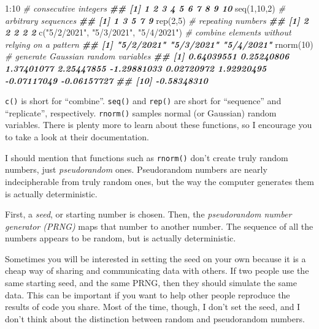 \documentclass[
  12pt,
  krantz2]{krantz}
\makeatletter
\newenvironment{Shaded}{\begin{snugshade}}{\end{snugshade}}
\newcommand{\CommentTok}[1]{\textcolor[rgb]{0.37,0.37,0.37}{\textit{#1}}}
\newcommand{\DecValTok}[1]{\textcolor[rgb]{0.06,0.06,0.06}{#1}}
\newcommand{\DocumentationTok}[1]{\textcolor[rgb]{0.37,0.37,0.37}{\textbf{\textit{#1}}}}
\newcommand{\FunctionTok}[1]{\textcolor[rgb]{0,0,0}{#1}}
\newcommand{\NormalTok}[1]{#1}
\newcommand{\SpecialCharTok}[1]{\textcolor[rgb]{0,0,0}{#1}}
\newcommand{\StringTok}[1]{\textcolor[rgb]{0.5,0.5,0.5}{#1}}
\newenvironment{kframe}{%
\medskip{}
\setlength{\fboxsep}{.8em}
 \def\at@end@of@kframe{}%
 \ifinner\ifhmode%
  \def\at@end@of@kframe{\end{minipage}}%
  \begin{minipage}{\columnwidth}%
 \fi\fi%
 \def\FrameCommand##1{\hskip\@totalleftmargin \hskip-\fboxsep
 \colorbox{shadecolor}{##1}\hskip-\fboxsep
     \hskip-\linewidth \hskip-\@totalleftmargin \hskip\columnwidth}%
 \MakeFramed {\advance\hsize-\width
   \@totalleftmargin\z@ \linewidth\hsize
   \@setminipage}}%
 {\par\unskip\endMakeFramed%
 \at@end@of@kframe}
\renewenvironment{Shaded}{\begin{kframe}}{\end{kframe}}
\makeatother
\begin{document}
\begin{Shaded}
\begin{Highlighting}[]
\DecValTok{1}\SpecialCharTok{:}\DecValTok{10}         \CommentTok{\# consecutive integers}
\DocumentationTok{\#\#  [1]  1  2  3  4  5  6  7  8  9 10}
\FunctionTok{seq}\NormalTok{(}\DecValTok{1}\NormalTok{,}\DecValTok{10}\NormalTok{,}\DecValTok{2}\NormalTok{)  }\CommentTok{\# arbitrary sequences}
\DocumentationTok{\#\# [1] 1 3 5 7 9}
\FunctionTok{rep}\NormalTok{(}\DecValTok{2}\NormalTok{,}\DecValTok{5}\NormalTok{)     }\CommentTok{\# repeating numbers}
\DocumentationTok{\#\# [1] 2 2 2 2 2}
\FunctionTok{c}\NormalTok{(}\StringTok{"5/2/2021"}\NormalTok{, }\StringTok{"5/3/2021"}\NormalTok{, }\StringTok{"5/4/2021"}\NormalTok{) }\CommentTok{\# combine elements without relying on a pattern}
\DocumentationTok{\#\# [1] "5/2/2021" "5/3/2021" "5/4/2021"}
\FunctionTok{rnorm}\NormalTok{(}\DecValTok{10}\NormalTok{)                             }\CommentTok{\# generate Gaussian random variables}
\DocumentationTok{\#\#  [1]  0.64039551  0.25240806  1.37401077  2.25447855 {-}1.29881033  0.02720972  1.92920495 {-}0.07117049 {-}0.06157727}
\DocumentationTok{\#\# [10] {-}0.58348310}
\end{Highlighting}
\end{Shaded}

\texttt{c()} is short for ``combine''. \texttt{seq()} and \texttt{rep()} are short for ``sequence'' and ``replicate'', respectively. \texttt{rnorm()} samples normal (or Gaussian) random variables. There is plenty more to learn about these functions, so I encourage you to take a look at their documentation.

I should mention that functions such as \texttt{rnorm()} don't create truly random numbers, just \emph{pseudorandom} ones. Pseudorandom numbers are nearly indecipherable from truly random ones, but the way the computer generates them is actually deterministic.

First, a \emph{seed}, or starting number is chosen. Then, the \emph{pseudorandom number generator (PRNG)} maps that number to another number. The sequence of all the numbers appears to be random, but is actually deterministic.

Sometimes you will be interested in setting the seed on your own because it is a cheap way of sharing and communicating data with others. If two people use the same starting seed, and the same PRNG, then they should simulate the same data. This can be important if you want to help other people reproduce the results of code you share. Most of the time, though, I don't set the seed, and I don't think about the distinction between random and pseudorandom numbers.
\end{document}
